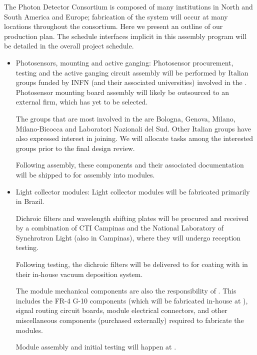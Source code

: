 The Photon Detector Consortium is composed of many institutions in North and South America and Europe; fabrication of the system will occur at many locations throughout the consortium.  Here we present an outline of our production plan.  The schedule interfaces implicit in this assembly program will be detailed in the overall project schedule.

\begin{itemize}

\item Photosensors, mounting and active ganging:  Photosensor procurement, testing and the active ganging circuit assembly will be performed by Italian groups funded by INFN (and their associated universities) involved in the . Photosensor mounting board assembly will likely be outsourced to an external firm, which has yet to be selected.

The groups that are most involved in the  are Bologna, Genova, Milano, Milano-Bicocca and Laboratori Nazionali del Sud.  Other Italian groups have also expressed interest in joining.  We will allocate tasks among the interested groups prior to the final design review.

Following assembly, these components and their associated  documentation will be shipped to  for assembly into  modules.

\item Light collector modules:  Light collector modules will be fabricated primarily in Brazil.  

Dichroic filters and wavelength shifting plates will be procured and received by a combination of CTI Campinas and the National Laboratory of Synchrotron Light (also in Campinas), where they will undergo reception  testing.

Following testing, the dichroic filters will be delivered to  for coating with  in their in-house vacuum deposition system.

The module mechanical components are also the responsibility of .  This includes the FR-4 G-10 components (which will be fabricated in-house at ), signal routing circuit boards, module electrical connectors, and other miscellaneous components (purchased externally) required to fabricate the modules.

Module assembly and initial  testing will happen at .


\end{itemize}
